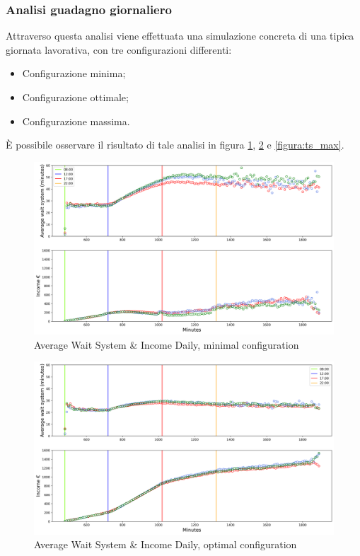 \documentclass{article}
\begin{document}
\subsubsection{Analisi guadagno giornaliero}
Attraverso questa analisi viene effettuata una simulazione concreta di una tipica giornata lavorativa, con tre configurazioni differenti:
\begin{itemize}
	\item Configurazione minima;
	\item Configurazione ottimale;
	\item Configurazione massima.
\end{itemize} 
È possibile osservare il risultato di tale analisi in figura \ref{figura:ts_min}, \ref{figura:ts_optimal} e \ref{figura:ts_max}.
\begin{figure}[H]
	\centering
	\captionsetup{justification=centering,margin=2cm}
	\includegraphics[scale=0.48]{images/ts_min.png}
	\caption{Average Wait System \& Income Daily, minimal configuration}\label{figura:ts_min}
\end{figure}
\begin{figure}[H]
	\centering
	\captionsetup{justification=centering,margin=2cm}
	\includegraphics[scale=0.48]{images/ts_optimal.png}
	\caption{Average Wait System \& Income Daily, optimal configuration}\label{figura:ts_optimal}
\end{figure}
\end{document}
